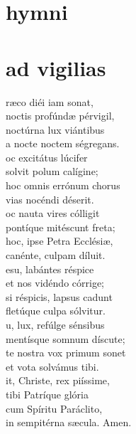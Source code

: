 \thispagestyle{plain}

\section{hymni}

\section{ad vigilias}




\vspace{0.15cm}



\def\greinitialformat#1{{\fontsize{45}{45}\selectfont #1}}

\begin{multicols}{2}
 


\noindent{}ræco diéi iam sonat, \\
noctis profúndæ pérvigil, \\
noctúrna lux viántibus\\
a nocte noctem ségregans.\\

\noindent{}oc excitátus lúcifer\\
solvit polum calígine;\\
hoc omnis errónum chorus\\
vias nocéndi déserit.\\

\noindent{}oc nauta vires cólligit\\
pontíque mitéscunt freta;\\
hoc, ipse Petra Ecclésiæ, \\
canénte, culpam díluit.\\

\noindent{}esu, labántes réspice\\
et nos vidéndo córrige;\\
si réspicis, lapsus cadunt\\
fletúque culpa sólvitur.\\

\noindent{}u, lux, refúlge sénsibus\\
mentísque somnum díscute;\\
te nostra vox primum sonet\\
et vota solvámus tibi.\\

\noindent{}it, Christe, rex piíssime, \\
tibi Patríque glória\\
cum Spíritu Paráclito,\\ 
in sempitérna sæcula. Amen.\\

\end{multicols}


